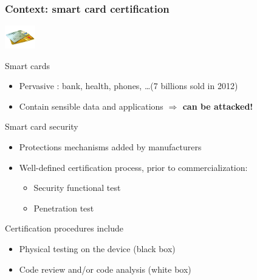 \begin{frame} \frametitle{Context: smart card certification}
\vfill
\includegraphics[height=1cm]{sm1.jpg} 
\vfill
\begin{block}{Smart cards}
\begin{itemize}
\item Pervasive : bank, health, phones, \ldots (7 billions sold in 2012) 
\vfill
\item Contain sensible data and applications 
		\alert{{\bf $\Rightarrow$ can be attacked!}}
\end{itemize}
\end{block}
\vfill
\begin{block}{Smart card security}
\begin{itemize}
	\item Protections mechanisms added by manufacturers 
	\item Well-defined \alert{certification process}, prior to commercialization:
	\begin{itemize}
		\item Security functional test
		\item \alert{Penetration test} 
	\end{itemize}
\end{itemize}
\end{block}
\begin{block}{Certification procedures include}
	\begin{itemize}
	\item Physical testing on the device (black box)
	\item \alert{Code review and/or code analysis (white box)}
	\end{itemize}
\end{block}
\vfill
\end{frame}

